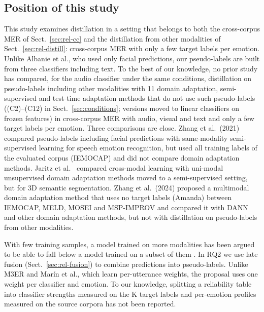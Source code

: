 \subsection{Position of this study}\label{sec:position}
This study examines distillation in a setting that belongs to both the cross-corpus MER of Sect.~\ref{sec:rel-cc} and the distillation from other modalities of Sect.~\ref{sec:rel-distill}: cross-corpus MER with only a few target labels per emotion. Unlike Albanie et al., who used only facial predictions, our pseudo-labels are built from three classifiers including text. To the best of our knowledge, no prior study has compared, for the audio classifier under the same conditions, distillation on pseudo-labels including other modalities with 11 domain adaptation, semi-supervised and test-time adaptation methods that do not use such pseudo-labels ((C2)--(C12) in Sect.~\ref{sec:conditions}; versions moved to linear classifiers on frozen features) in cross-corpus MER with audio, visual and text and only a few target labels per emotion. Three comparisons are close. Zhang et al.\ (2021) \cite{zhang2021combining} compared pseudo-labels including facial predictions with same-modality semi-supervised learning for speech emotion recognition, but used all training labels of the evaluated corpus (IEMOCAP) and did not compare domain adaptation methods. Jaritz et al.\ \cite{jaritz2023xmossda} compared cross-modal learning with uni-modal unsupervised domain adaptation methods moved to a semi-supervised setting, but for 3D semantic segmentation. Zhang et al.\ (2024) \cite{zhang2024amanda} proposed a multimodal domain adaptation method that uses no target labels (Amanda) between IEMOCAP, MELD, MOSEI and MSP-IMPROV and compared it with DANN and other domain adaptation methods, but not with distillation on pseudo-labels from other modalities.

With few training samples, a model trained on more modalities has been argued to be able to fall below a model trained on a subset of them \cite{huang2021}. In RQ2 we use late fusion (Sect.~\ref{sec:rel-fusion}) to combine predictions into pseudo-labels. Unlike M3ER and Mar\'in et al., which learn per-utterance weights, the proposal uses one weight per classifier and emotion. To our knowledge, splitting a reliability table into classifier strengths measured on the K target labels and per-emotion profiles measured on the source corpora has not been reported.
